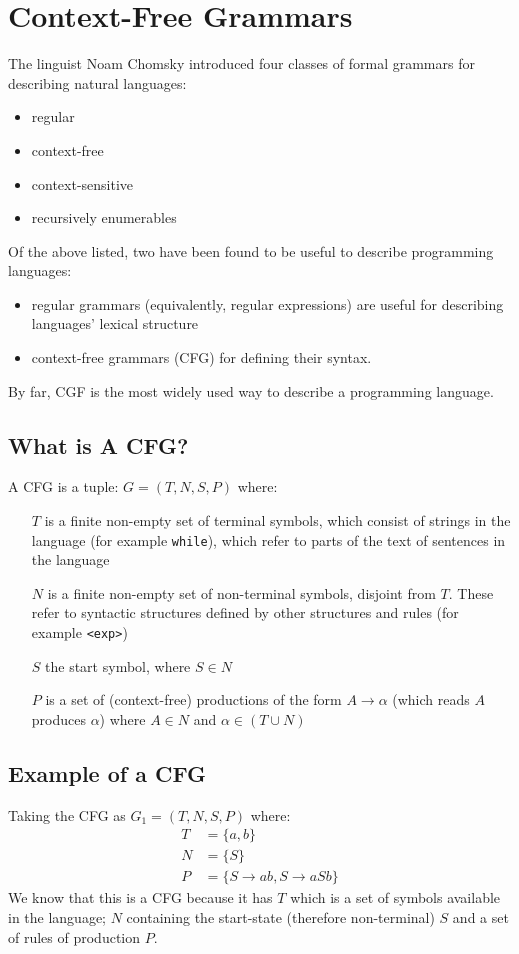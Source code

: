 
\section{Context-Free Grammars}
The linguist Noam Chomsky introduced four classes of formal grammars for describing natural languages:
\begin{itemize}
    \item regular
    \item context-free
    \item context-sensitive
    \item recursively enumerables
\end{itemize}
Of the above listed, two have been found to be useful to describe programming languages:
\begin{itemize}
    \item regular grammars (equivalently, regular expressions) are useful for describing languages' lexical structure
    \item context-free grammars (CFG) for defining their syntax.
\end{itemize}

By far, CGF is the most widely used way to describe a programming language.

\subsection{What is A CFG?}
A CFG is a tuple: $G=(T,N,S,P)$ where:
\begin{itemize}
    \item[$T$] is a finite non-empty set of terminal symbols, which consist of strings in the language (for example \verb|while|), which refer to parts of the text of sentences in the language
    \item[$N$] is a finite non-empty set of non-terminal symbols, disjoint from $T$. These refer to syntactic structures defined by other structures and rules (for example \verb|<exp>|)
    \item[$S$] the start symbol, where $S \in N$
    \item[$P$] is a set of (context-free) productions of the form $A \rightarrow \alpha$ (which reads $A$ produces $\alpha$) where $A \in N$ and $\alpha \in (T \cup N)$
\end{itemize}

\subsection{Example of a CFG}
Taking the CFG as $G_1 = (T, N, S, P)$ where:
\begin{align*}
    T &= \{a, b\}\\
    N &= \{S\}\\
    P &= \{S \rightarrow ab, S \rightarrow aSb\}
\end{align*}
We know that this is a CFG because it has $T$ which is a set of symbols available in the language; $N$ containing the start-state (therefore non-terminal) $S$ and a set of rules of production $P$.\\


